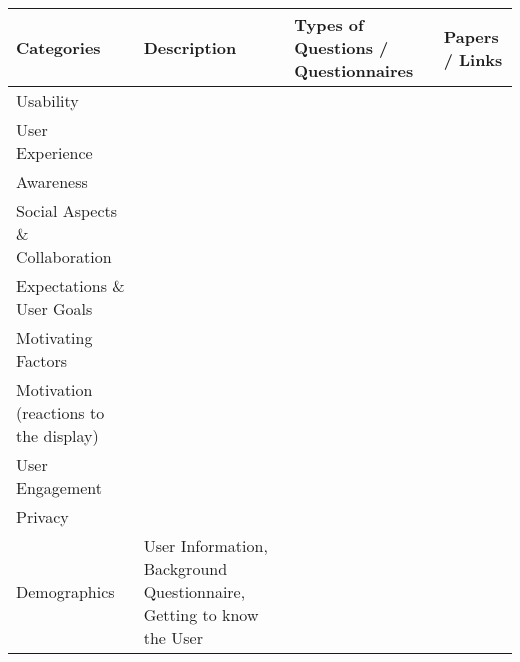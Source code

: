 \begin{tabular}{llll}
\toprule
\cline{1-1}
\multicolumn{1}{|l|}{\textbf{Categories}} & \textbf{Description}                                                  & \textbf{Types of Questions / Questionnaires} & \textbf{Papers / Links} \\ \midrule
Usability                                 &                                                                       &                                              &                         \\ \hline
User Experience                           &                                                                       &                                              &                         \\ \hline
Awareness                                 &                                                                       &                                              &                         \\ \hline
Social Aspects \& Collaboration           &                                                                       &                                              &                         \\ \hline
Expectations \& User Goals                &                                                                       &                                              &                         \\ \hline
Motivating Factors                        &                                                                       &                                              &                         \\ \hline
Motivation (reactions to the display)     &                                                                       &                                              &                         \\ \hline
User Engagement                           &                                                                       &                                              &                         \\ \hline
Privacy                                   &                                                                       &                                              &                         \\
Demographics                              & User Information, Background Questionnaire, Getting to know the User  &                                              &                         \\

\end{tabular}
